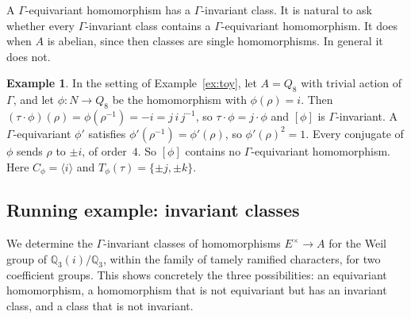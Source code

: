 \documentclass[12pt,letterpaper]{article}
\numberwithin{equation}{section}
\theoremstyle{plain}
\theoremstyle{definition}
\newtheorem{example}[theorem]{Example}
\newcommand{\Q}{\mathbb{Q}}
\begin{document}
A $\Gamma$-equivariant homomorphism has a $\Gamma$-invariant class. It is
natural to ask whether every $\Gamma$-invariant class contains a
$\Gamma$-equivariant homomorphism. It does when $A$ is abelian, since then
classes are single homomorphisms. In general it does not.

\begin{example}\label{ex:toy-noeq}
In the setting of Example~\ref{ex:toy}, let $A=Q_8$ with trivial action
of $\Gamma$, and let $\phi:N\to Q_8$ be the homomorphism with
$\phi(\rho)=i$. Then $(\tau\cdot\phi)(\rho)=\phi(\rho^{-1})=-i=j\,i\,j^{-1}$,
so $\tau\cdot\phi=j\cdot\phi$ and $[\phi]$ is $\Gamma$-invariant. A
$\Gamma$-equivariant $\phi'$ satisfies $\phi'(\rho^{-1})=\phi'(\rho)$, so
$\phi'(\rho)^2=1$. Every conjugate of $\phi$ sends $\rho$ to $\pm i$, of
order~$4$. So $[\phi]$ contains no $\Gamma$-equivariant homomorphism. Here
$C_\phi=\langle i\rangle$ and $T_\phi(\tau)=\{\pm j,\pm k\}$.
\end{example}

\subsection{Running example: invariant classes}\label{ss:run2}

We determine the $\Gamma$-invariant classes of homomorphisms
$E^\times\to A$ for the Weil group of $\Q_3(i)/\Q_3$, within the family
of tamely ramified characters, for two coefficient groups. This shows
concretely the three possibilities: an equivariant homomorphism, a
homomorphism that is not equivariant but has an invariant class, and a
class that is not invariant.
\end{document}
